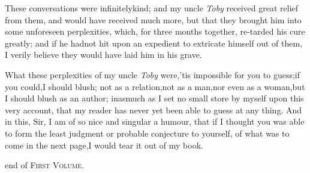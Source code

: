 \documentclass{article}
\begin{document}
These conversations were infinitely\break kind; and my uncle
\textit{Toby} received great relief from them, and would have
recei\-ved much more, but that they brought him into some unforeseen
perplexities, which, for three months together, re-\break tarded his
cure greatly; and if he had\pb not hit upon an
expedient to extricate himself out of them, I verily believe they
would have laid him in his grave.

What these perplexities of my uncle \textit{Toby}
were,\tsh  ’tis impossible for you to guess;\tsk  if
you could,\tsk  I should blush; not as a relation,\tsk  not as a
man,\tsk  nor even as a woman,\tsk  but I should blush as an
author; inasmuch as I set no small store by myself upon this very
account, that my reader has never yet been able to guess at any
thing. And in this, Sir, I am of so nice and singular a humour,
that if I thought you was able to form the least judgment or
probable conjecture to yourself, of what was to come in the next
page,\tsk  I would tear it out of my book.

\bigskip
\centerline{ end of \textsc{First Volume}.}
\end{document}
